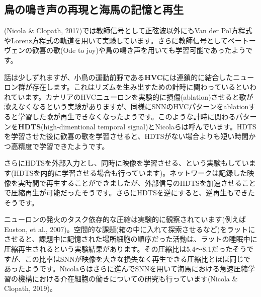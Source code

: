 \subsection{鳥の鳴き声の再現と海馬の記憶と再生}
(Nicola \& Clopath, 2017)では教師信号として正弦波以外にもVan der Pol方程式やLorenz方程式の軌道を用いて実験しています。さらに教師信号としてベートーヴェンの歓喜の歌(Ode to joy)や鳥の鳴き声を用いても学習可能であったようです。\par
話は少しずれますが、小鳥の運動前野である\textbf{HVC}には連鎖的に結合したニューロン群が存在します。これはリズムを生み出すための計時に関わっているといわれています。カナリアのHVCニューロンを実験的に損傷(ablation)させると歌が歌えなくなるという実験がありますが、同様にSNNのHVCパターンをablationすると学習した歌が再生できなくなったようです。このような計時に関わるパターンを\textbf{HDTS}(high-dimentional temporal signal)とNicolaらは呼んでいます。HDTSを学習させた後に歓喜の歌を学習させると、HDTSがない場合よりも短い時間かつ高精度で学習できたようです。\par
さらにHDTSを外部入力とし、同時に映像を学習させる、という実験もしています(HDTSを内的に学習させる場合も行っています)。ネットワークは記録した映像を実時間で再生することができましたが、外部信号のHDTSを加速させることで圧縮再生が可能だったそうです。さらにHDTSを逆にすると、逆再生もできたそうです。\par
ニューロンの発火のタスク依存的な圧縮は実験的に観察されています(例えばEuston, et al., 2007)。空間的な課題(箱の中に入れて探索させるなど)をラットにさせると、課題中に記憶された場所細胞の順序だった活動は、ラットの睡眠中に圧縮再生されるという実験結果があります。その圧縮比は5.4〜8.1だったそうですが、この比率はSNNが映像を大きな損失なく再生できる圧縮比とほぼ同じであったようです。Nicolaらはさらに進んでSNNを用いて海馬における急速圧縮学習の機構における介在細胞の働きについての研究も行っています(Nicola \& Clopath, 2019)。
